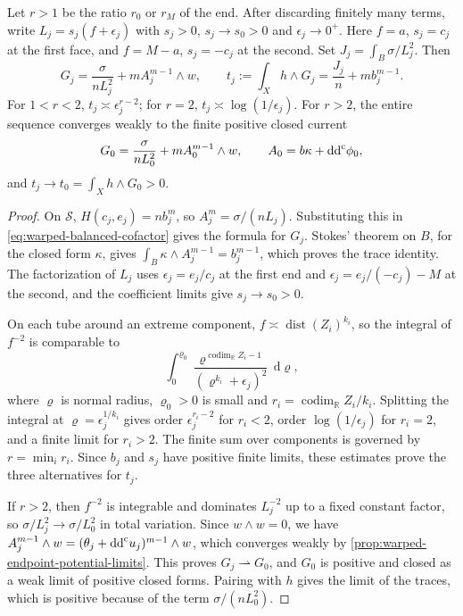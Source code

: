 \begin{proposition}\label{prop:warped-minimizer-trace}
Let $r>1$ be the ratio $r_0$ or $r_M$ of the end. After discarding finitely many terms, write $L_j=s_j(f+\epsilon_j)$ with $s_j>0$, $s_j\to s_0>0$ and $\epsilon_j\to0^+$. Here $f=a$, $s_j=c_j$ at the first face, and $f=M-a$, $s_j=-c_j$ at the second. Set $J_j=\int_B\sigma/L_j^2$. Then
\begin{equation}\label{eq:warped-minimizer-trace-mass}
 G_j=\frac{\sigma}{nL_j^2}+mA_j^{m-1}\wedge w,
 \qquad t_j:=\int_Xh\wedge G_j=\frac{J_j}{n}+mb_j^{m-1}.
\end{equation}
For $1<r<2$, $t_j\asymp\epsilon_j^{r-2}$; for $r=2$, $t_j\asymp\log(1/\epsilon_j)$. For $r>2$, the entire sequence converges weakly to the finite positive closed current
\[
 G_0=\frac{\sigma}{nL_0^2}+mA_0^{m-1}\wedge w,
 \qquad A_0=b\kappa+\mathrm{dd}^{\mathrm{c}}\phi_0,
\]
and $t_j\to t_0=\int_Xh\wedge G_0>0$.
\end{proposition}
\begin{proof}
On $\mathscr S$, $H(c_j,e_j)=nb_j^m$, so $A_j^m=\sigma/(nL_j)$. Substituting this in \eqref{eq:warped-balanced-cofactor} gives the formula for $G_j$. Stokes' theorem on $B$, for the closed form $\kappa$, gives $\int_B\kappa\wedge A_j^{m-1}=b_j^{m-1}$, which proves the trace identity. The factorization of $L_j$ uses $\epsilon_j=e_j/c_j$ at the first end and $\epsilon_j=e_j/(-c_j)-M$ at the second, and the coefficient limits give $s_j\to s_0>0$.

On each tube around an extreme component, $f\asymp\operatorname{dist}(Z_i)^{k_i}$, so the integral of $f^{-2}$ is comparable to
\[
 \int_0^{\varrho_0}\frac{\varrho^{\operatorname{codim}_{\mathbb R}Z_i-1}}{(\varrho^{k_i}+\epsilon_j)^2}\,\mathrm{d}\varrho,
\]
where $\varrho$ is normal radius, $\varrho_0>0$ is small and $r_i=\operatorname{codim}_{\mathbb R}Z_i/k_i$. Splitting the integral at $\varrho=\epsilon_j^{1/k_i}$ gives order $\epsilon_j^{r_i-2}$ for $r_i<2$, order $\log(1/\epsilon_j)$ for $r_i=2$, and a finite limit for $r_i>2$. The finite sum over components is governed by $r=\min_i r_i$. Since $b_j$ and $s_j$ have positive finite limits, these estimates prove the three alternatives for $t_j$.

If $r>2$, then $f^{-2}$ is integrable and dominates $L_j^{-2}$ up to a fixed constant factor, so $\sigma/L_j^2\to\sigma/L_0^2$ in total variation. Since $w\wedge w=0$, we have $A_j^{m-1}\wedge w=(\theta_j+\mathrm{dd}^{\mathrm{c}} u_j)^{m-1}\wedge w$, which converges weakly by \cref{prop:warped-endpoint-potential-limits}. This proves $G_j\rightharpoonup G_0$, and $G_0$ is positive and closed as a weak limit of positive closed forms. Pairing with $h$ gives the limit of the traces, which is positive because of the term $\sigma/(nL_0^2)$.
\end{proof}

